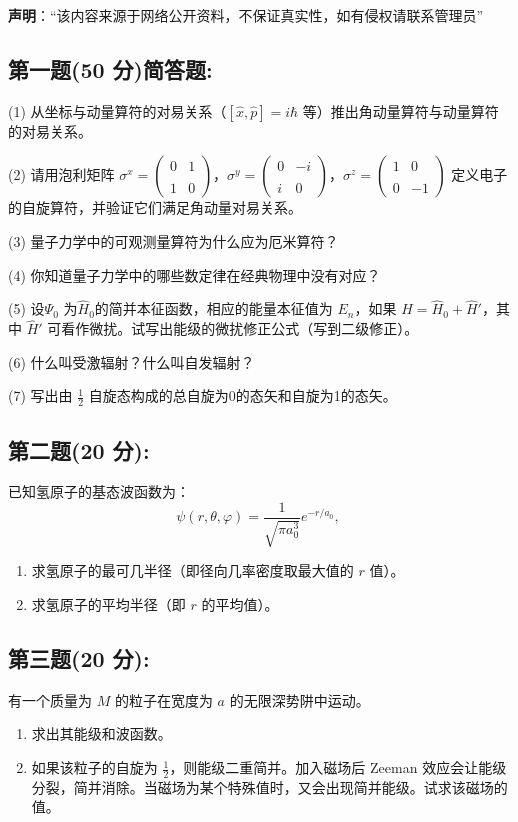
\textbf{声明}：“该内容来源于网络公开资料，不保证真实性，如有侵权请联系管理员”

\subsection{第一题(50 分)简答题:}
(1) 从坐标与动量算符的对易关系（$[\hat{x}, \hat{p}] = i\hbar$ 等）推出角动量算符与动量算符的对易关系。

(2) 请用泡利矩阵 $\sigma^x = \begin{pmatrix} 0 & 1 \\\\ 1 & 0 \end{pmatrix}$，$\sigma^y = \begin{pmatrix} 0 & -i \\\\ i & 0 \end{pmatrix}$，$\sigma^z = \begin{pmatrix} 1 & 0 \\\\ 0 & -1 \end{pmatrix}$ 定义电子的自旋算符，并验证它们满足角动量对易关系。

(3) 量子力学中的可观测量算符为什么应为厄米算符？

(4) 你知道量子力学中的哪些数定律在经典物理中没有对应？

(5) 设$\Psi_0$ 为$\hat{H}_0$的简并本征函数，相应的能量本征值为 $E_n$，如果 $\hat{H} = \hat{H}_0 + \hat{H}'$，其中 $\hat{H}'$ 可看作微扰。试写出能级的微扰修正公式（写到二级修正）。

(6) 什么叫受激辐射？什么叫自发辐射？

(7) 写出由 $\frac{1}{2}$ 自旋态构成的总自旋为0的态矢和自旋为1的态矢。
\subsection{第二题(20 分):}
已知氢原子的基态波函数为：
\[\psi(r, \theta, \varphi) = \frac{1}{\sqrt{\pi a_0^3}} e^{-r / a_0},~\]
\begin{enumerate}
    \item 求氢原子的最可几半径（即径向几率密度取最大值的 $r$ 值）。
    \item 求氢原子的平均半径（即 $r$ 的平均值）。
\end{enumerate}
\subsection{第三题(20 分):}
有一个质量为 $M$ 的粒子在宽度为 $a$ 的无限深势阱中运动。
\begin{enumerate}
    \item 求出其能级和波函数。
    \item 如果该粒子的自旋为 $\frac{1}{2}$，则能级二重简并。加入磁场后 Zeeman 效应会让能级分裂，简并消除。当磁场为某个特殊值时，又会出现简并能级。试求该磁场的值。
\end{enumerate}
